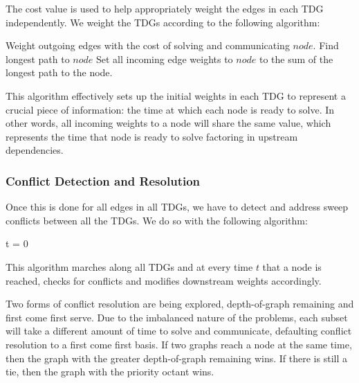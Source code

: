 \documentclass[11pt, letterpaper,titlepage,oneside]{article}
\begin{document}
The cost value is used to help appropriately weight the edges in each TDG independently. We weight the TDGs according to the following algorithm:

\begin{algorithm}[H]
\begin{algorithmic}
\STATE Weight outgoing edges with the cost of solving and communicating $node$.
\ENDFOR
{}
\STATE Find longest path to $node$
\STATE Set all incoming edge weights to $node$ to the sum of the longest path to the node.
\ENDFOR
\label{universalweights}
\end{algorithmic}
\end{algorithm}

This algorithm effectively sets up the initial weights in each TDG to represent a crucial piece of information: the time at which each node is ready to solve. In other words, all incoming weights to a node will share the same value, which represents the time that node is ready to solve factoring in upstream dependencies. 

\subsubsection{Conflict Detection and Resolution}

Once this is done for all edges in all TDGs, we have to detect and address sweep conflicts between all the TDGs. We do so with the following algorithm:
\begin{algorithm}[H]
\begin{algorithmic}
\STATE t = 0
\ELSE
	\ENDIF
\ENDIF
{}
\ENDWHILE
\label{conflict}
\end{algorithmic}
\end{algorithm}

This algorithm marches along all TDGs and at every time $t$ that a node is reached, checks for conflicts and modifies downstream weights accordingly. 

Two forms of conflict resolution are being explored, depth-of-graph remaining and first come first serve. Due to the imbalanced nature of the problems, each subset will take a different amount of time to solve and communicate, defaulting conflict resolution to a first come first basis. If two graphs reach a node at the same time, then the graph with the greater depth-of-graph remaining wins. If there is still a tie, then the graph with the priority octant wins.
\end{document}
